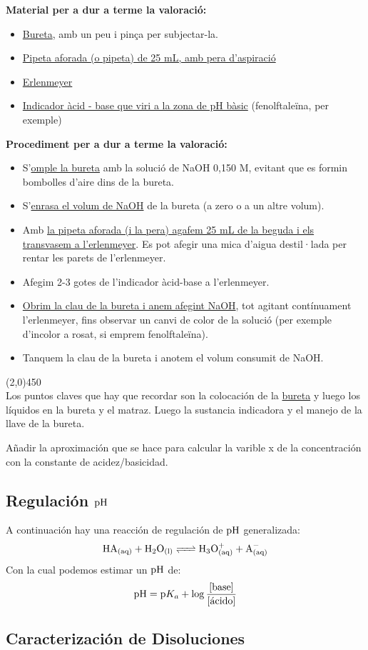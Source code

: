 \documentclass[arial,a4paper,print]{article}
\begin{document}
\textbf{Material per a dur a terme la valoració:}
\begin{itemize}
	\item \underline{Bureta}, amb un peu i pinça per subjectar-la.
	\item \underline{Pipeta aforada (o pipeta) de 25 mL, amb pera d’aspiració}
	\item \underline{Erlenmeyer}
	\item \underline{Indicador àcid - base que viri a la zona de pH bàsic} (fenolftaleïna, per exemple)
\end{itemize}
\textbf{Procediment per a dur a terme la valoració:}
\begin{itemize}
	\item S’\underline{omple la bureta} amb la solució de NaOH 0,150 M, evitant que es formin
bombolles d’aire dins de la bureta.
	\item S’\underline{enrasa el volum de NaOH} de la bureta (a zero o a un altre volum).
	\item Amb \underline{la pipeta aforada (i la pera) agafem 25 mL de la beguda i els transvasem a
l’erlenmeyer}. Es pot afegir una mica d’aigua destil·lada per rentar les parets
de l’erlenmeyer.
	\item Afegim 2-3 gotes de l’indicador àcid-base a l’erlenmeyer.
	\item \underline{Obrim la clau de la bureta i anem afegint NaOH}, tot agitant contínuament
l’erlenmeyer, fins observar un canvi de color de la solució (per exemple
d’incolor a rosat, si emprem fenolftaleïna).
	\item Tanquem la clau de la bureta i anotem el volum consumit de NaOH. 
\end{itemize}
\line(2,0){450}
\\
Los puntos claves que hay que recordar son la colocación de la \underline{bureta} y luego los líquidos en la bureta y el matraz. Luego la sustancia indicadora y el manejo de la llave de la bureta. 


Añadir la aproximación que se hace para calcular la varible x de la concentración con la constante de acidez/basicidad. 

\subsection{Regulación $\ce{pH}$}
A continuación hay una reacción de regulación de $\ce{pH}$ generalizada:
\begin{equation*}
	\ce{HA_{(aq)} + H2O_{(l)} <=> H3O^+_{(aq)} + A^-_{(aq)}}
\end{equation*}
Con la cual podemos estimar un $\ce{pH}$ de:
\begin{equation*}
	\ce{pH} = \ce{p}K_{a} + \log\frac{[\text{base}]}{[\text{ácido}]}
\end{equation*}

\subsection{Caracterización de Disoluciones}
\end{document}
